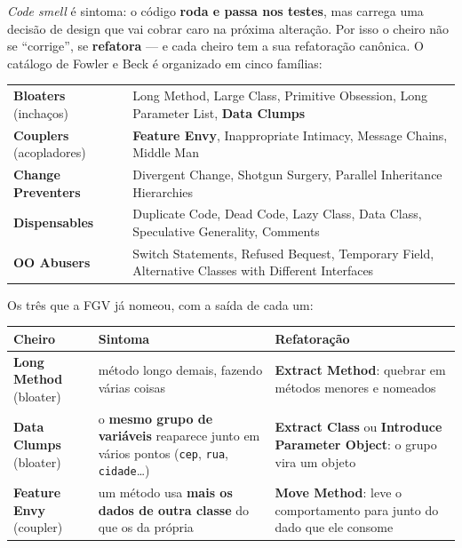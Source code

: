 \begin{conceito}
\emph{Code smell} é sintoma: o código \textbf{roda e passa nos testes}, mas
carrega uma decisão de design que vai cobrar caro na próxima alteração. Por
isso o cheiro não se ``corrige'', se \textbf{refatora} --- e cada cheiro tem
a sua refatoração canônica. O catálogo de Fowler e Beck é organizado em cinco
famílias:

\begin{center}
\begin{tabular}{@{}p{3.2cm}p{8.8cm}@{}}
\toprule
\textbf{Bloaters} \newline (inchaços) & Long Method, Large Class, Primitive
Obsession, Long Parameter List, \textbf{Data Clumps} \\
\textbf{Couplers} \newline (acopladores) & \textbf{Feature Envy},
Inappropriate Intimacy, Message Chains, Middle Man \\
\textbf{Change Preventers} & Divergent Change, Shotgun Surgery, Parallel
Inheritance Hierarchies \\
\textbf{Dispensables} & Duplicate Code, Dead Code, Lazy Class, Data Class,
Speculative Generality, Comments \\
\textbf{OO Abusers} & Switch Statements, Refused Bequest, Temporary Field,
Alternative Classes with Different Interfaces \\
\bottomrule
\end{tabular}
\end{center}

Os três que a FGV já nomeou, com a saída de cada um:

\begin{center}
\begin{tabular}{@{}p{2.8cm}p{4.4cm}p{4.4cm}@{}}
\toprule
\textbf{Cheiro} & \textbf{Sintoma} & \textbf{Refatoração} \\
\midrule
\textbf{Long Method} \newline (bloater) & método longo demais, fazendo várias
coisas & \textbf{Extract Method}: quebrar em métodos menores e nomeados \\
\addlinespace
\textbf{Data Clumps} \newline (bloater) & o \textbf{mesmo grupo de variáveis}
reaparece junto em vários pontos (\texttt{cep}, \texttt{rua},
\texttt{cidade}\dots) & \textbf{Extract Class} ou \textbf{Introduce Parameter
Object}: o grupo vira um objeto \\
\addlinespace
\textbf{Feature Envy} \newline (coupler) & um método usa \textbf{mais os
dados de outra classe} do que os da própria & \textbf{Move Method}: leve o
comportamento para junto do dado que ele consome \\
\bottomrule
\end{tabular}
\end{center}
\end{conceito}

